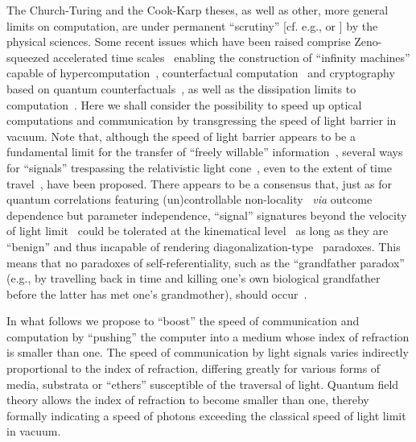 \documentclass[12pt]{article}
\begin{document}
The Church-Turing and the Cook-Karp theses, as well as other,
more general limits on computation, are under permanent ``scrutiny'' [cf.  e.g., \citet[p~11]{davis-58} or  \citet[p.~5]{deutsch}] by the physical sciences.
Some recent issues which have been raised comprise Zeno-squeezed accelerated time scales~\citep{weyl:49,Hogarth92,DBLP:conf/mcu/Durand-Lose04,Nemeti2006118,1612095}
enabling the construction of ``infinity machines'' capable of hypercomputation~\citep{Davis-2006,Doria-2006,ord-2006},
counterfactual computation~\citep{GRAEMEMITCHISON05082001} and cryptography~\citep{PhysRevLett.103.230501} based on quantum counterfactuals~\citep{elitzur-vaidman:1,vaidman:2009},
as well as the dissipation limits to computation~\citep{maxwell-demon}.
Here we shall consider the possibility to speed up optical~\citep{Chiao:02} computations and communication by transgressing the speed of light barrier in vacuum.
Note that, although the speed of light barrier appears to be a fundamental limit for the transfer of ``freely willable'' information~\citep{recami:01},
several ways for ``signals'' trespassing the relativistic light cone~\citep{0264-9381-11-5-001},
even to the extent of time travel~\citep{godel-sch,nahin,PhysRevD.46.603,deutsch91,svozil-greenberger-2005}, have been proposed.
There appears to be a consensus that, just as for quantum correlations featuring (un)controllable non-locality~\citep{shimony2}
{\it via} outcome dependence but parameter independence, ``signal'' signatures beyond the velocity of light limit~\citep{0953-4075-35-6-201}
could be tolerated at the kinematical level~\citep{Liberati2002167} as long as they are ``benign''
and thus incapable of rendering diagonalization-type~\citep{davis-58,smullyan-92} paradoxes.
This means that no paradoxes of self-referentiality, such as the ``grandfather paradox'' (e.g.,
by  travelling back in time and killing one's own biological grandfather before the latter has met one's grandmother),
should occur~\citep{bell-j-l-paradox}.

In what follows we propose to ``boost'' the speed of communication and computation
by ``pushing'' the computer into a medium whose index of refraction is smaller than one.
The speed of communication by light signals varies indirectly proportional to the index of refraction,
differing  greatly for various forms of media,
substrata or ``ethers'' susceptible of the traversal of light.
Quantum field theory allows the index of refraction to become smaller than one, thereby
formally indicating a speed of photons exceeding the classical speed of light limit in vacuum.
\end{document}
